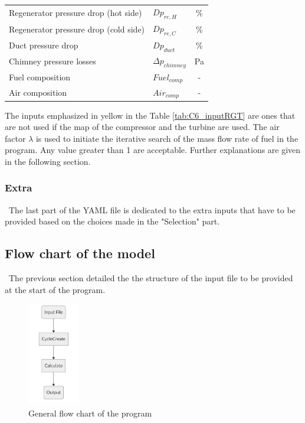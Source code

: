 \begin{longtable}[c]{@{}llc@{}}
Regenerator pressure drop (hot side)  & $Dp_{re,H}$                               & \%            \\
Regenerator pressure drop (cold side) & $Dp_{re,C}$                               & \%            \\
Duct pressure drop                    & $Dp_{duct}$                               & \%            \\
Chimney pressure losses               & $\Delta p_{chimney}$                      & Pa            \\
Fuel composition                      & $Fuel_{comp}$                             & -             \\
Air composition                       & $Air_{comp}$                              & -             \\* \bottomrule
\end{longtable}

The inputs emphasized in yellow in the Table \ref{tab:C6_inputRGT} are ones that are not used if the map of the compressor and the turbine are used. The air factor $\lambda$ is used to initiate the iterative search of the mass flow rate of fuel in the program. Any value greater than 1 are acceptable. Further explanations are given in the following section.

\subsubsection{Extra}
\quad\ The last part of the YAML file is dedicated to the extra inputs that have to be provided based on the choices made in the "Selection" part. 

\subsection{Flow chart of the model}
\quad\,  The previous section detailed the the structure of the input file to be provided at the start of the program.  
\begin{figure}[h]
\centering
\includegraphics[width=0.2\textwidth]{Chapitre_6/Images/GeneralFlowChart.png}
\caption{General flow chart of the program}
\label{fig:C6_flowchart}
\end{figure}

